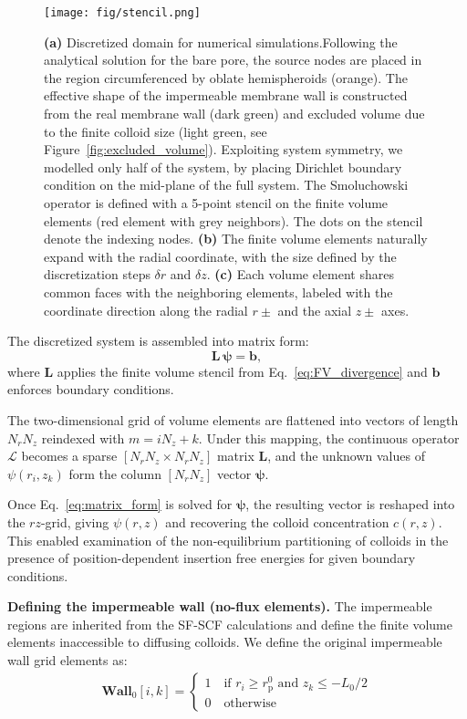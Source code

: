\documentclass[10pt, a4paper, twocolumn]{article}
\begin{document}
\begin{figure}[]
    \texttt{[image: fig/stencil.png]}
    \caption{
        \textbf{(a)} Discretized domain for numerical simulations.Following the analytical solution for the bare pore, the source nodes are placed in the region circumferenced by oblate hemispheroids (orange).
        The effective shape of the impermeable membrane wall is constructed from the real membrane wall (dark green) and excluded volume due to the finite colloid size (light green, see Figure~\ref{fig:excluded_volume}).
        Exploiting system symmetry, we modelled only half of the system, by placing Dirichlet boundary condition on the mid-plane  of the full system.
        The Smoluchowski operator is defined with a 5-point stencil on the finite volume elements (red element with grey neighbors).
        The dots on the stencil denote the indexing nodes.
        \textbf{(b)} The finite volume elements naturally expand with the radial coordinate, with the size defined by the discretization steps $\delta r$ and $\delta z$.
        \textbf{(c)} Each volume element shares common faces with the neighboring elements, labeled with the coordinate direction along the radial $r \pm$ and the axial $z\pm$ axes.
  }
  \label{fig:stencil}
\end{figure}

The discretized system is assembled into matrix form:
\begin{equation}
  \mathbf L\, \bm{\psi}=\bm b,
  \label{eq:matrix_form}
\end{equation}
where $\mathbf{L}$ applies the finite volume stencil from Eq.~\eqref{eq:FV_divergence} and $\bm b$ enforces boundary conditions.

The two-dimensional grid of volume elements are flattened into vectors of length $N_rN_z$ reindexed with $m=iN_z+k$.
Under this mapping, the continuous operator $\mathcal L$ becomes a sparse $[N_rN_z\times N_rN_z]$ matrix $\mathbf L$, and the unknown values of $\psi(r_i, z_k)$ form the column $[N_rN_z]$ vector $\bm{\psi}$.

Once Eq.~\eqref{eq:matrix_form} is solved for $\bm{\psi}$, the resulting vector is reshaped into the $rz$-grid, giving $\psi(r,z)$ and recovering the colloid concentration $c(r,z)$.
This enabled examination of the non-equilibrium partitioning of colloids in the presence of position-dependent insertion free energies for given boundary conditions.

\bigskip\noindent
\textbf{Defining the impermeable wall (no-flux elements).}
The impermeable regions are inherited from the SF-SCF calculations and define the finite volume elements inaccessible to diffusing colloids.
We define the original impermeable wall grid elements as:
\begin{eqnarray}
    \textbf{Wall}_{0} [i,k] = 
    \begin{cases}
        1 \quad \text{if } r_i \ge r_{\text{p}}^0 \text{ and } z_k \le -L_0/2 \\
        0 \quad \text{otherwise}
    \end{cases}
\end{eqnarray}
\end{document}
